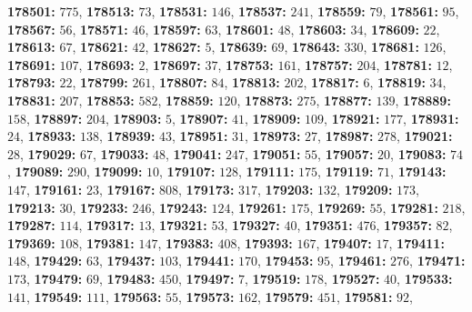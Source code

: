 \textsf{\bfseries 178501:} $775$, \textsf{\bfseries 178513:} $73$, \textsf{\bfseries 178531:} $146$, \textsf{\bfseries 178537:} $241$, \textsf{\bfseries 178559:} $79$, \textsf{\bfseries 178561:} $95$, \textsf{\bfseries 178567:} $56$, \textsf{\bfseries 178571:} $46$, \textsf{\bfseries 178597:} $63$, \textsf{\bfseries 178601:} $48$, \textsf{\bfseries 178603:} $34$, \textsf{\bfseries 178609:} $22$, \textsf{\bfseries 178613:} $67$, \textsf{\bfseries 178621:} $42$, \textsf{\bfseries 178627:} $5$, \textsf{\bfseries 178639:} $69$, \textsf{\bfseries 178643:} $330$, \textsf{\bfseries 178681:} $126$, \textsf{\bfseries 178691:} $107$, \textsf{\bfseries 178693:} $2$, \textsf{\bfseries 178697:} $37$, \textsf{\bfseries 178753:} $161$, \textsf{\bfseries 178757:} $204$, \textsf{\bfseries 178781:} $12$, \textsf{\bfseries 178793:} $22$, \textsf{\bfseries 178799:} $261$, \textsf{\bfseries 178807:} $84$, \textsf{\bfseries 178813:} $202$, \textsf{\bfseries 178817:} $6$, \textsf{\bfseries 178819:} $34$, \textsf{\bfseries 178831:} $207$, \textsf{\bfseries 178853:} $582$, \textsf{\bfseries 178859:} $120$, \textsf{\bfseries 178873:} $275$, \textsf{\bfseries 178877:} $139$, \textsf{\bfseries 178889:} $158$, \textsf{\bfseries 178897:} $204$, \textsf{\bfseries 178903:} $5$, \textsf{\bfseries 178907:} $41$, \textsf{\bfseries 178909:} $109$, \textsf{\bfseries 178921:} $177$, \textsf{\bfseries 178931:} $24$, \textsf{\bfseries 178933:} $138$, \textsf{\bfseries 178939:} $43$, \textsf{\bfseries 178951:} $31$, \textsf{\bfseries 178973:} $27$, \textsf{\bfseries 178987:} $278$, \textsf{\bfseries 179021:} $28$, \textsf{\bfseries 179029:} $67$, \textsf{\bfseries 179033:} $48$, \textsf{\bfseries 179041:} $247$, \textsf{\bfseries 179051:} $55$, \textsf{\bfseries 179057:} $20$, \textsf{\bfseries 179083:} $74$, \textsf{\bfseries 179089:} $290$, \textsf{\bfseries 179099:} $10$, \textsf{\bfseries 179107:} $128$, \textsf{\bfseries 179111:} $175$, \textsf{\bfseries 179119:} $71$, \textsf{\bfseries 179143:} $147$, \textsf{\bfseries 179161:} $23$, \textsf{\bfseries 179167:} $808$, \textsf{\bfseries 179173:} $317$, \textsf{\bfseries 179203:} $132$, \textsf{\bfseries 179209:} $173$, \textsf{\bfseries 179213:} $30$, \textsf{\bfseries 179233:} $246$, \textsf{\bfseries 179243:} $124$, \textsf{\bfseries 179261:} $175$, \textsf{\bfseries 179269:} $55$, \textsf{\bfseries 179281:} $218$, \textsf{\bfseries 179287:} $114$, \textsf{\bfseries 179317:} $13$, \textsf{\bfseries 179321:} $53$, \textsf{\bfseries 179327:} $40$, \textsf{\bfseries 179351:} $476$, \textsf{\bfseries 179357:} $82$, \textsf{\bfseries 179369:} $108$, \textsf{\bfseries 179381:} $147$, \textsf{\bfseries 179383:} $408$, \textsf{\bfseries 179393:} $167$, \textsf{\bfseries 179407:} $17$, \textsf{\bfseries 179411:} $148$, \textsf{\bfseries 179429:} $63$, \textsf{\bfseries 179437:} $103$, \textsf{\bfseries 179441:} $170$, \textsf{\bfseries 179453:} $95$, \textsf{\bfseries 179461:} $276$, \textsf{\bfseries 179471:} $173$, \textsf{\bfseries 179479:} $69$, \textsf{\bfseries 179483:} $450$, \textsf{\bfseries 179497:} $7$, \textsf{\bfseries 179519:} $178$, \textsf{\bfseries 179527:} $40$, \textsf{\bfseries 179533:} $141$, \textsf{\bfseries 179549:} $111$, \textsf{\bfseries 179563:} $55$, \textsf{\bfseries 179573:} $162$, \textsf{\bfseries 179579:} $451$, \textsf{\bfseries 179581:} $92$, 

